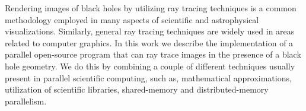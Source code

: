 Rendering images of black holes by utilizing ray tracing techniques is a common
methodology employed in many aspects of scientific and astrophysical visualizations.
Similarly, general ray tracing techniques are widely used in areas related to computer graphics.
In this work we describe the implementation of a parallel open-source program that can ray trace images in the presence of a black hole geometry.
We do this by combining a couple of different techniques usually present in parallel scientific computing,
such as, mathematical approximations, utilization of scientific libraries, shared-memory and distributed-memory parallelism.

